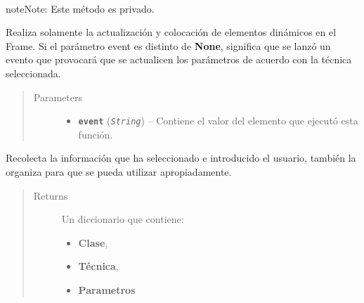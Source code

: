 \documentclass[class=report, crop=false]{standalone}
\begin{document}
\begin{fulllineitems}
\begin{fulllineitems}
\end{fulllineitems}

\begin{fulllineitems}

~

\begin{notice}{note}{Note:}
Este método es privado.
\end{notice}

Realiza solamente la actualización y colocación de elementos 
dinámicos en el Frame.\break
Si el parámetro event es distinto de \textbf{None}, significa 
que se lanzó un evento que provocará que se actualicen los 
parámetros de acuerdo con la técnica seleccionada.

\begin{quote}\begin{description}
\item[{Parameters}] \leavevmode\begin{itemize}
\item \textbf{\texttt{event}} (\emph{\texttt{String}}) -- Contiene el valor del elemento que ejecutó esta función.
\end{itemize}
\end{description}\end{quote}

\end{fulllineitems}

\begin{fulllineitems}

Recolecta la información que ha seleccionado e introducido 
el usuario, también la organiza para que se pueda utilizar 
apropiadamente.

\begin{quote}\begin{description}
\item[{Returns}] \leavevmode

Un diccionario que contiene:

\begin{itemize}
\item \textbf{Clase},
\item \textbf{Técnica},
\item \textbf{Parametros}
\end{itemize}


\end{description}
\end{quote}
\end{fulllineitems}
\end{fulllineitems}
\end{document}
